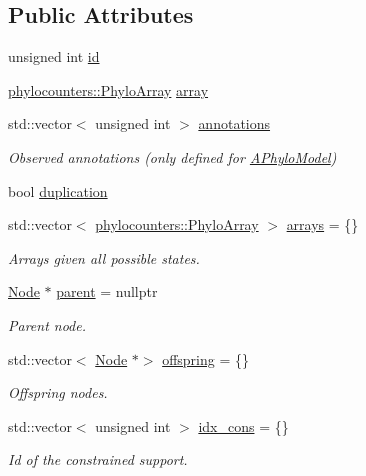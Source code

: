 \subsection*{Public Attributes}
\begin{DoxyCompactItemize}
\item 
unsigned int \hyperlink{class_node_adb90577d9d796c4ccbccf41ce2efc6c9}{id}
\item 
\hyperlink{namespacebarry_1_1counters_1_1phylo_abd293bf65e494e903639fb5fb2c91604}{phylocounters\+::\+Phylo\+Array} \hyperlink{class_node_a86d6575dd1ad7ab0cb02c6e6202b0608}{array}
\item 
std\+::vector$<$ unsigned int $>$ \hyperlink{class_node_aea43a76094980788d1debd3e18ed8070}{annotations}
\begin{DoxyCompactList}\small\item\em Observed annotations (only defined for \hyperlink{class_a_phylo_model}{A\+Phylo\+Model}) \end{DoxyCompactList}\item 
bool \hyperlink{class_node_a3129939e8a58c055cb5ad8db8be6b10a}{duplication}
\item 
std\+::vector$<$ \hyperlink{namespacebarry_1_1counters_1_1phylo_abd293bf65e494e903639fb5fb2c91604}{phylocounters\+::\+Phylo\+Array} $>$ \hyperlink{class_node_a269d78db10090d106c697d7c73bac9c7}{arrays} = \{\}
\begin{DoxyCompactList}\small\item\em Arrays given all possible states. \end{DoxyCompactList}\item 
\hyperlink{class_node}{Node} $\ast$ \hyperlink{class_node_ad8184598cdea70e4bbdfd76f2b0f9e85}{parent} = nullptr
\begin{DoxyCompactList}\small\item\em Parent node. \end{DoxyCompactList}\item 
std\+::vector$<$ \hyperlink{class_node}{Node} $\ast$$>$ \hyperlink{class_node_a4e7e9c69da2575cad9c5fb7865dd42c7}{offspring} = \{\}
\begin{DoxyCompactList}\small\item\em Offspring nodes. \end{DoxyCompactList}\item 
std\+::vector$<$ unsigned int $>$ \hyperlink{class_node_a95fa1b71d6c1a8cf155520c6d974d540}{idx\+\_\+cons} = \{\}
\begin{DoxyCompactList}\small\item\em Id of the constrained support. \end{DoxyCompactList}\item 
$$
\end{DoxyCompactItemize}
